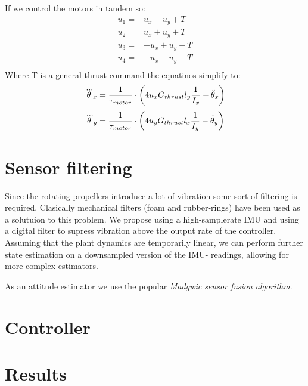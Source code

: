 If we control the motors in tandem so:
\begin{align*}
u_1 = & u_x - u_y + T\\
u_2 = & u_x + u_y + T\\
u_3 = & -u_x + u_y + T\\
u_4 = & -u_x - u_y + T\\
\end{align*}
Where T is a general thrust command the equatinos simplify to:
\begin{equation}
 \dddot\theta_x = \frac{1}{\tau_{motor}} \cdot \left(
 4 u_x G_{thrust} l_{y} \frac{ 1 }{ I_{x} }  - \ddot\theta_x
 \right) 
\end{equation}
\begin{equation}
 \dddot\theta_y = \frac{1}{\tau_{motor}} \cdot \left(
4 u_y G_{thrust} l_{x} \frac{ 1 }{ I_{y} }  - \ddot\theta_y
 \right) 
\end{equation}


\section{ Sensor filtering } %
Since the rotating propellers introduce a lot of vibration some sort of
filtering is required. Clasically mechanical filters (foam and rubber-rings) have
been used as a solutuion to this problem. We propose using a high-samplerate
IMU and using a digital filter to supress vibration above the output rate of the
controller. Assuming that the plant dynamics are temporarily linear, we can
perform further state estimation on a downsampled version of the IMU- readings,
allowing for more complex estimators.

As an attitude estimator we use the popular \emph{Madgwic sensor fusion
algorithm}.

\section{ Controller } %

\section{ Results } %



%
%






